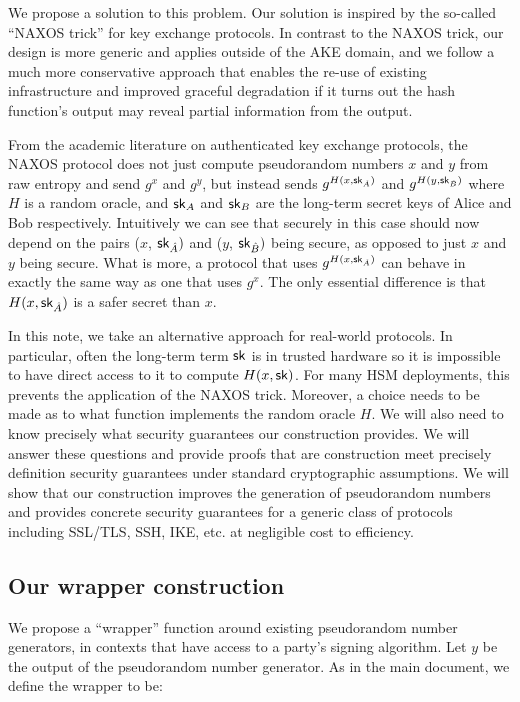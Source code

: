 \documentclass{article}
\begin{document}
We propose a solution to this problem. Our solution is inspired by the
so-called ``NAXOS trick'' for key exchange protocols. In contrast to the
NAXOS trick, our design is more generic and applies outside of the AKE
domain, and we follow a much more conservative approach that enables the
re-use of existing infrastructure and improved graceful degradation if
it turns out the hash function's output may reveal partial information
from the output.

From the academic literature on authenticated key exchange protocols, the NAXOS protocol \cite{LaMacchiaeCK2007} does not just compute pseudorandom numbers $x$ and $y$ from raw entropy and send $g^{x}$ and $g^{y}$, but instead sends $g^{H(x, \mathsf{sk}_{\hat A})}$ and $g^{H(y, \mathsf{sk}_{\hat B})}$ where $H$ is a random oracle, and $\mathsf{sk}_{A}$ and $\mathsf{sk}_{B}$ are the long-term secret keys of Alice and Bob respectively. Intuitively we can see that securely in this case should now depend on the pairs ($x$, $\mathsf{sk}_{\hat A})$ and ($y$, $\mathsf{sk}_{\hat B})$ being secure, as opposed to just $x$ and $y$ being secure. What is more, a protocol that uses $g^{H(x, \mathsf{sk}_{\hat A})}$ can behave in exactly the same way as one that uses $g^x$. The only essential difference is that $H(x, \mathsf{sk}_{\hat A})$ is a safer secret than $x$.

In this note, we take an alternative approach for real-world protocols.
In particular, often the long-term term $\mathsf{sk}$ is in trusted hardware so
it is impossible to have direct access to it to compute $H(x, \mathsf{sk})$.
For many HSM deployments, this prevents the application of the NAXOS
trick.
Moreover, a choice needs to be made as to what function implements the
random oracle $H$. We will also need to know precisely what security
guarantees our construction provides.  We will answer these questions
and provide proofs that are construction meet precisely definition
security guarantees under standard cryptographic assumptions. We will
show that our construction improves the generation of pseudorandom
numbers and provides concrete security guarantees for a generic class of
protocols including SSL/TLS, SSH, IKE, etc. at negligible cost to efficiency. 

\subsection*{Our wrapper construction}

We propose a ``wrapper'' function around existing
pseudorandom number generators, in contexts that have access to a
party's signing algorithm. Let $y$ be the output of the pseudorandom
number generator. As in the main document, we define the wrapper to be:
\end{document}
